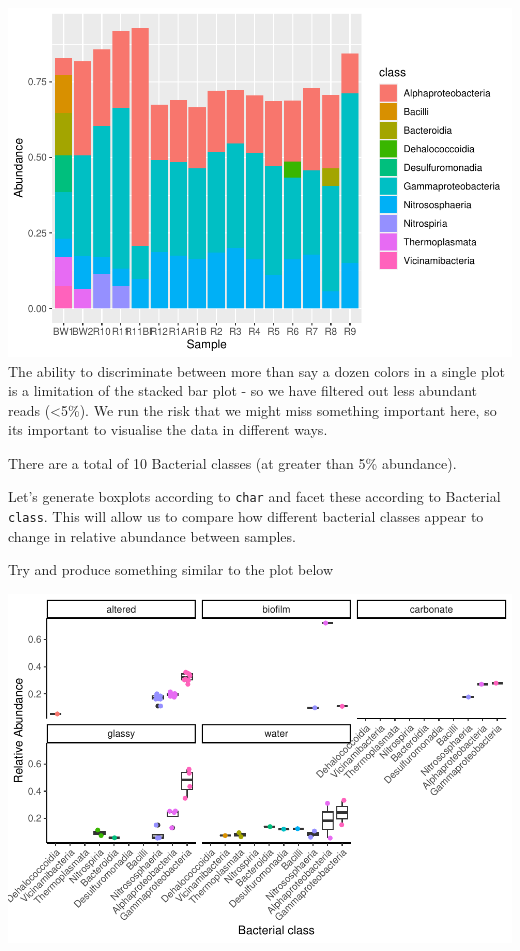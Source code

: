 \documentclass[
]{book}
\begin{document}
\includegraphics{bookdown-demo_files/figure-latex/unnamed-chunk-67-1.pdf}
The ability to discriminate between more than say a dozen colors in a single plot is a limitation of the stacked bar plot - so we have filtered out less abundant reads (\textless5\%). We run the risk that we might miss something important here, so its important to visualise the data in different ways.

There are a total of 10 Bacterial classes (at greater than 5\% abundance).

Let's generate boxplots according to \texttt{char} and facet these according to Bacterial \texttt{class}. This will allow us to compare how different bacterial classes appear to change in relative abundance between samples.

Try and produce something similar to the plot below

\includegraphics{bookdown-demo_files/figure-latex/unnamed-chunk-68-1.pdf}
\end{document}
